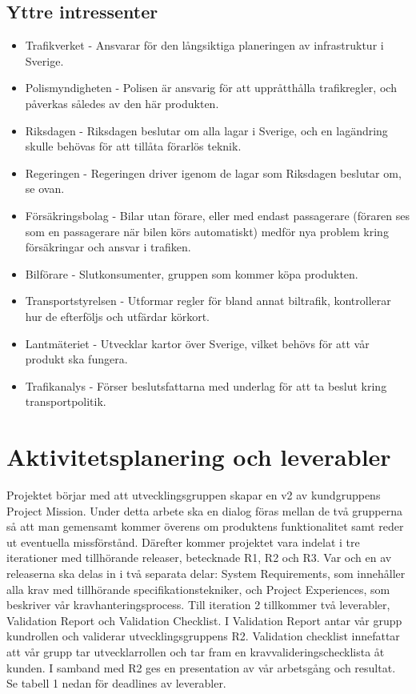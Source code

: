 \documentclass[10pt]{article}
\begin{document}
\subsection{Yttre intressenter}
\noindent
\begin{itemize}
	\setlength\itemsep{0.1em}
	\item Trafikverket - Ansvarar för den långsiktiga planeringen av infrastruktur i Sverige.
	\item Polismyndigheten - Polisen är ansvarig för att uppråtthålla trafikregler, och påverkas således av den här produkten.
	\item Riksdagen - Riksdagen beslutar om alla lagar i Sverige, och en lagändring skulle behövas för att tillåta förarlös teknik.
	\item Regeringen - Regeringen driver igenom de lagar som Riksdagen beslutar om, se ovan.
	\item Försäkringsbolag - Bilar utan förare, eller med endast passagerare (föraren ses som en passagerare när bilen körs automatiskt) medför nya problem kring försäkringar och ansvar i trafiken.
	\item Bilförare - Slutkonsumenter, gruppen som kommer köpa produkten.
	\item Transportstyrelsen - Utformar regler för bland annat biltrafik, kontrollerar hur de efterföljs och utfärdar körkort.
	\item Lantmäteriet - Utvecklar kartor över Sverige, vilket behövs för att vår produkt ska fungera.
	\item Trafikanalys - Förser beslutsfattarna med underlag för att ta beslut kring transportpolitik.
\end{itemize}

\section{Aktivitetsplanering och leverabler}
\sloppy
\noindent
Projektet börjar med att utvecklingsgruppen skapar en v2 av kundgruppens Project Mission. Under detta arbete ska en dialog föras mellan de två grupperna så att man gemensamt kommer överens om produktens funktionalitet samt reder ut eventuella missförstånd.  
Därefter kommer projektet vara indelat i tre iterationer med tillhörande releaser, betecknade R1, R2 och R3. Var och en av releaserna ska delas in i två separata delar: System Requirements, som innehåller alla krav med tillhörande specifikationstekniker, och Project Experiences, som beskriver vår kravhanteringsprocess. Till iteration 2 tillkommer två leverabler, Validation Report och Validation Checklist. I Validation Report antar vår grupp kundrollen och validerar utvecklingsgruppens R2. Validation checklist innefattar att vår grupp tar utvecklarrollen och tar fram en kravvalideringschecklista åt kunden. I samband med R2 ges en presentation av vår arbetsgång och resultat. Se tabell 1 nedan för deadlines av leverabler.  
\\
\\
\end{document}
